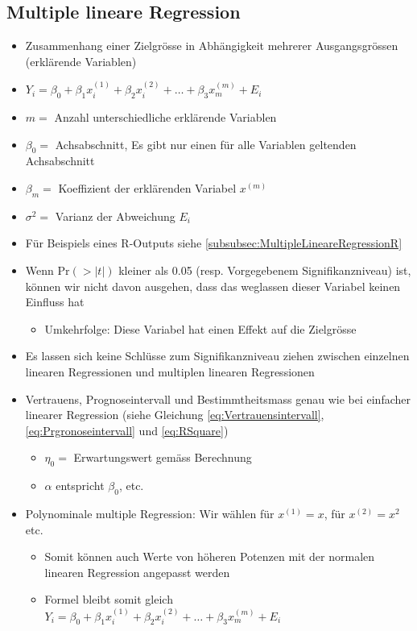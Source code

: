 \subsection{Multiple lineare Regression}
\begin{itemize}
	\item Zusammenhang einer Zielgrösse in Abhängigkeit mehrerer Ausgangsgrössen (erklärende Variablen)
	\item $Y_i = \beta_0+\beta_1 x_i^{(1)}+\beta_2 x_i^{(2)}+\ldots+\beta_3 x_m^{(m)}+E_i$
	\item $m =$ Anzahl unterschiedliche erklärende Variablen
	\item $\beta_0 =$ Achsabschnitt, Es gibt nur einen für alle Variablen geltenden Achsabschnitt 
	\item $\beta_m = $ Koeffizient der erklärenden Variabel $x^{(m)}$
	\item $\sigma^2 = $ Varianz der Abweichung $E_i$
	\item Für Beispiels eines R-Outputs siehe \ref{subsubsec:MultipleLineareRegressionR}
	\item Wenn $\text{Pr}(>\vert t \vert)$ kleiner als 0.05 (resp. Vorgegebenem Signifikanzniveau) ist, können wir nicht davon ausgehen, dass das weglassen dieser Variabel keinen Einfluss hat
	\begin{itemize}
		\item Umkehrfolge: Diese Variabel hat einen Effekt auf die Zielgrösse
	\end{itemize}
	\item Es lassen sich keine Schlüsse zum Signifikanzniveau ziehen zwischen einzelnen linearen Regressionen und multiplen linearen Regressionen
	\item Vertrauens, Prognoseintervall und Bestimmtheitsmass genau wie bei einfacher linearer Regression (siehe Gleichung \ref{eq:Vertrauensintervall}, \ref{eq:Prgronoseintervall} und \ref{eq:RSquare})
	\begin{itemize}
		\item $\eta_0 = $ Erwartungswert gemäss Berechnung
		\item $\alpha$ entspricht $\beta_0$, etc.
	\end{itemize}
	\item Polynominale multiple Regression: Wir wählen für $x^{(1)} = x$, für $x^{(2)} = x^2$ etc.  
	\begin{itemize}
		\item Somit können auch Werte von höheren Potenzen mit der normalen linearen Regression angepasst werden 
		\item Formel bleibt somit gleich $Y_i = \beta_0+\beta_1 x_i^{(1)}+\beta_2 x_i^{(2)}+\ldots+\beta_3 x_m^{(m)}+E_i$ 
	\end{itemize} 
\end{itemize}

